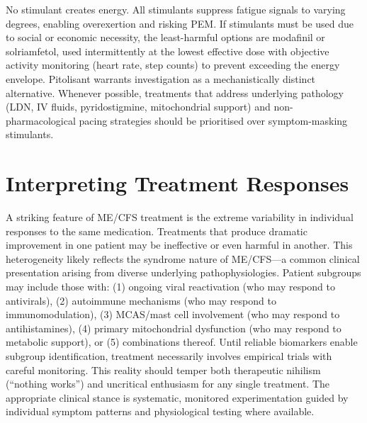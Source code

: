 \begin{keypoint}
No stimulant creates energy. All stimulants suppress fatigue signals to varying degrees, enabling overexertion and risking PEM. If stimulants must be used due to social or economic necessity, the least-harmful options are modafinil or solriamfetol, used intermittently at the lowest effective dose with objective activity monitoring (heart rate, step counts) to prevent exceeding the energy envelope. Pitolisant warrants investigation as a mechanistically distinct alternative. Whenever possible, treatments that address underlying pathology (LDN, IV fluids, pyridostigmine, mitochondrial support) and non-pharmacological pacing strategies should be prioritised over symptom-masking stimulants.
\end{keypoint}

\section{Interpreting Treatment Responses}
\label{sec:treatment-interpretation}

\begin{observation}
A striking feature of ME/CFS treatment is the extreme variability in individual responses to the same medication. Treatments that produce dramatic improvement in one patient may be ineffective or even harmful in another. This heterogeneity likely reflects the syndrome nature of ME/CFS---a common clinical presentation arising from diverse underlying pathophysiologies. Patient subgroups may include those with: (1) ongoing viral reactivation (who may respond to antivirals), (2) autoimmune mechanisms (who may respond to immunomodulation), (3) MCAS/mast cell involvement (who may respond to antihistamines), (4) primary mitochondrial dysfunction (who may respond to metabolic support), or (5) combinations thereof. Until reliable biomarkers enable subgroup identification, treatment necessarily involves empirical trials with careful monitoring. This reality should temper both therapeutic nihilism (``nothing works'') and uncritical enthusiasm for any single treatment. The appropriate clinical stance is systematic, monitored experimentation guided by individual symptom patterns and physiological testing where available.
\end{observation}

